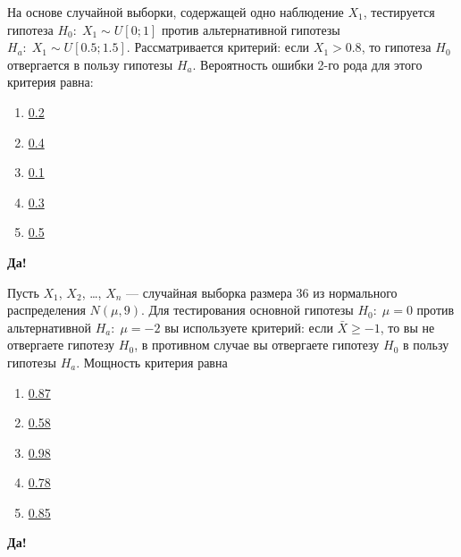 \documentclass[t]{beamer}
\begin{document}
 \begin{frame} \label{13-Yes} 
\begin{block}{13} 

На основе случайной выборки, содержащей одно наблюдение  $X_1$, тестируется гипотеза $H_0: \; X_1 \sim U[0;1]$  против альтернативной гипотезы  $H_a: \; X_1 \sim U[0.5;1.5]$. Рассматривается критерий: если $X_1>0.8$, то гипотеза $H_0$  отвергается в пользу гипотезы  $H_a$. Вероятность ошибки 2-го рода для этого критерия равна:
 


 \end{block} 
\begin{enumerate} 
\item[] \hyperlink{13-No}{\beamergotobutton{} 0.2}
\item[] \hyperlink{13-No}{\beamergotobutton{} 0.4}
\item[] \hyperlink{13-No}{\beamergotobutton{} 0.1}
\item[] \hyperlink{13-Yes}{\beamergotobutton{} 0.3}
\item[] \hyperlink{13-No}{\beamergotobutton{} 0.5}
\end{enumerate} 

 \textbf{Да!} 
 \hyperlink{14}{}\end{frame} 


 \begin{frame} \label{14-Yes} 
\begin{block}{14} 

Пусть $X_1$, $X_2$, \ldots, $X_n$ — случайная выборка размера 36 из нормального распределения $N(\mu, 9)$. Для тестирования основной гипотезы  $H_0: \; \mu=0$  против альтернативной $H_a: \; \mu=-2$   вы используете критерий: если  $\bar{X}\geq -1$, то вы не отвергаете гипотезу $H_0$, в противном случае вы отвергаете гипотезу  $H_0$ в пользу гипотезы  $H_a$. Мощность критерия равна
 


 \end{block} 
\begin{enumerate} 
\item[] \hyperlink{14-No}{\beamergotobutton{} 0.87}
\item[] \hyperlink{14-No}{\beamergotobutton{} 0.58}
\item[] \hyperlink{14-Yes}{\beamergotobutton{} 0.98}
\item[] \hyperlink{14-No}{\beamergotobutton{} 0.78}
\item[] \hyperlink{14-No}{\beamergotobutton{} 0.85}
\end{enumerate} 

 \textbf{Да!} 
 \hyperlink{15}{}\end{frame} 
\end{document}
